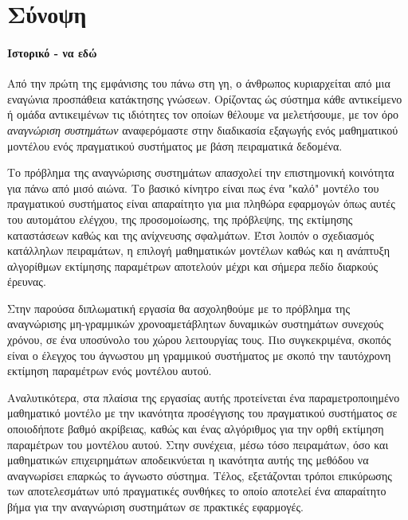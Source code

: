 \chapter*{Σύνοψη}
\subsubsection{Ιστορικό - να εδώ}
Από την πρώτη της εμφάνισης του πάνω στη γη, ο άνθρωπος κυριαρχείται από μια εναγώνια προσπάθεια κατάκτησης γνώσεων. Ορίζοντας ώς σύστημα κάθε αντικείμενο ή ομάδα αντικειμένων τις ιδιότητες τον οποίων θέλουμε να μελετήσουμε, με τον όρο \textit{αναγνώριση συστημάτων} αναφερόμαστε στην διαδικασία εξαγωγής ενός μαθηματικού μοντέλου ενός πραγματικού συστήματος με βάση πειραματικά δεδομένα. 

Το πρόβλημα της αναγνώρισης συστημάτων απασχολεί την επιστημονική κοινότητα για πάνω από μισό αιώνα. Το βασικό κίνητρο είναι πως ένα "καλό" μοντέλο του πραγματικού συστήματος είναι απαραίτητο για μια πληθώρα εφαρμογών όπως αυτές του αυτομάτου ελέγχου, της προσομοίωσης, της πρόβλεψης, της εκτίμησης καταστάσεων καθώς και της ανίχνευσης σφαλμάτων. Έτσι λοιπόν ο σχεδιασμός κατάλληλων πειραμάτων, η επιλογή μαθηματικών μοντέλων καθώς και η ανάπτυξη αλγορίθμων εκτίμησης παραμέτρων αποτελούν  μέχρι και σήμερα πεδίο διαρκούς έρευνας.

Στην παρούσα διπλωματική εργασία θα ασχοληθούμε με το πρόβλημα της αναγνώρισης μη-γραμμικών χρονοαμετάβλητων δυναμικών συστημάτων συνεχούς χρόνου, σε ένα υποσύνολο του χώρου λειτουργίας τους. Πιο συγκεκριμένα, σκοπός είναι ο έλεγχος του άγνωστου μη γραμμικού συστήματος με σκοπό την ταυτόχρονη εκτίμηση παραμέτρων ενός μοντέλου αυτού. 

Αναλυτικότερα, στα πλαίσια της εργασίας αυτής προτείνεται ένα παραμετροποιημένο μαθηματικό μοντέλο με την ικανότητα προσέγγισης του πραγματικού συστήματος σε οποιοδήποτε βαθμό ακρίβειας, καθώς και ένας αλγόριθμος για την ορθή εκτίμηση παραμέτρων του μοντέλου αυτού. Στην συνέχεια, μέσω τόσο πειραμάτων, όσο και μαθηματικών επιχειρημάτων αποδεικνύεται η ικανότητα αυτής της μεθόδου να αναγνωρίσει επαρκώς το άγνωστο σύστημα. Τέλος, εξετάζονται τρόποι επικύρωσης των αποτελεσμάτων υπό πραγματικές συνθήκες το οποίο αποτελεί ένα απαραίτητο βήμα για την αναγνώριση συστημάτων σε πρακτικές εφαρμογές.



